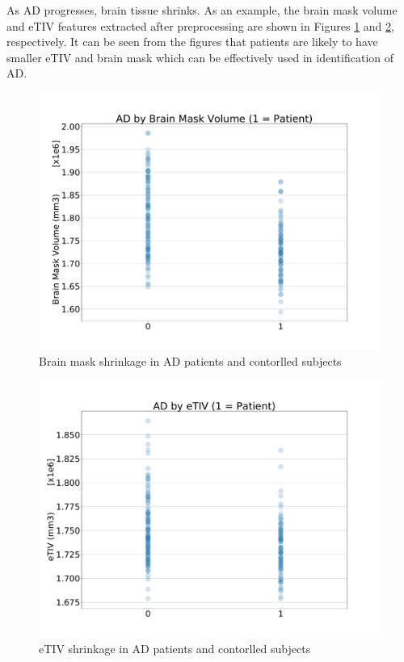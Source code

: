 As AD progresses, brain tissue shrinks. As an example, the brain mask volume and eTIV features extracted after preprocessing are shown in Figures \ref{fig:AD-MaskVol} and \ref{fig:AD-eTIV}, respectively. It can be seen from the figures that patients are likely to have smaller eTIV and brain mask which can be effectively used in identification of AD.

\begin{figure}
	\centering
	\includegraphics[width=\columnwidth]{images/AD-MaskVol.pdf}
	\caption{Brain mask shrinkage in AD patients and contorlled subjects}
	\label{fig:AD-MaskVol}
\end{figure} 

\begin{figure}
	\centering
	\includegraphics[width=\columnwidth]{images/AD-eTIV.pdf}
	\caption{eTIV shrinkage in AD patients and contorlled subjects}
	\label{fig:AD-eTIV}
\end{figure} 

